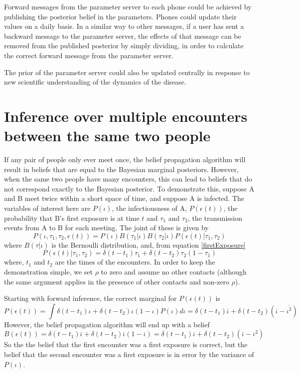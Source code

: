 \documentclass{article}
\begin{document}
Forward messages from the parameter server to each phone could be achieved by publishing the posterior belief in the parameters. Phones could update their values on a daily basis. In a similar way to other messages, if a user has sent a backward message to the parameter server, the effects of that message can be removed from the published posterior by simply dividing, in order to calculate the correct forward message from the parameter server.

The prior of the parameter server could also be updated centrally in response to new scientific understanding of the dynamics of the disease.

\section{Inference over multiple encounters between the same two people}

If any pair of people only ever meet once, the belief propagation algorithm will result in beliefs that are equal to the Bayesian marginal posteriors. However, when the same two people have many encounters, this can lead to beliefs that do not correspond exactly to the Bayesian posterior. To demonstrate this, suppose A and B meet twice within a short space of time, and suppose A is infected. The variables of interest here are $P(\iota)$, the infectiousness of A, $P(\epsilon(t))$, the probability that B's first exposure is at time $t$ and $\tau_1$ and $\tau_2$, the transmission events from A to B for each meeting. The joint of these is given by
\[
P(\iota, \tau_1, \tau_2, \epsilon(t)) = P(\iota)B(\tau_1|\iota)B(\tau_2|\iota)P(\epsilon(t)|\tau_1,\tau_2)
\]
where $B(\tau|\iota)$ is the Bernoulli distribution, and, from equation \ref{firstExposure}
\[
P(\epsilon(t)|\tau_1,\tau_2) = \delta(t-t_1)\tau_1 + \delta(t-t_2)\tau_2(1-\tau_1)
\]
where, $t_1$ and $t_2$ are the times of the encounters. In order to keep the demonstration simple, we set $\rho$ to zero and assume no other contacts (although the same argument applies in the presence of other contacts and non-zero $\rho$).

Starting with forward inference, the correct marginal for $P(\epsilon(t))$ is
\[
P(\epsilon(t)) = \int \delta(t-t_1)\iota + \delta(t-t_2)\iota(1-\iota) P(\iota) d\iota = \delta(t-t_1)\overline{\iota} + \delta(t-t_2)\left(\overline{\iota} - \overline{\iota^2}\right) 
\]
However, the belief propagation algorithm will end up with a belief
\[
B(\epsilon(t)) = \delta(t-t_1)\overline{\iota} + \delta(t-t_2)\overline{\iota}(1-\overline{\iota}) = \delta(t-t_1)\overline{\iota} + \delta(t-t_2)\left(\overline{\iota}-\overline{\iota}^2\right)
\]
So the the belief that the first encounter was a first exposure is correct, but the belief that the second encounter was a first exposure is in error by the variance of $P(\iota)$.
\end{document}
